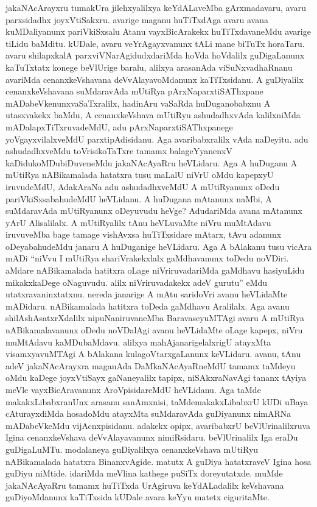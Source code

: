 \documentclass[11pt,a4size]{article}
\begin{document}
jakaNAcArayxru tumakUra jilehxyalilxya keYdALaveMba gArxmadavaru,
avaru parxsidadhx joyxVtiSakxru. avarige maganu huTiTxdAga avaru avana
kuMDaliyanunx pariVkiSxsalu Atanu vayxBicArakekx huTiTxdavaneMdu
avarige tiLidu baMditu. kUDale, avaru veYrAgayxvanunx tALi mane biTuTx
horaTaru. avaru shilapxkalA parxviVNarAgidudxdariMda hoVda hoVdalilx
guDigaLanunx kaTuTxtatx konege beVlUrige baralu, alilxya arasanAda
viSuNxvadhaRnanu avariMda cenanxkeVshavana deVvAlayavoMdanunx
kaTiTxsidanu. A guDiyalilx cenanxkeVshavana suMdaravAda mUtiRya
pArxNaparxtiSAThxpane mADabeVkenunxvaSaTxralilx, hadinAru vaSaRda
huDuganobabxnu A utasxvakekx baMdu, A cenanxkeVshava mUtiRyu
ashudadhxvAda kalilxniMda mADalapxTiTxruvadeMdU, adu
pArxNaparxtiSAThxpanege yoVgayxvilalxveMdU parxtipAdisidanu. Aga
avaribabxralilx vAda naDeyitu. adu ashudadhxveMdu toVrisikoTaTxre
tamamx balageYyanenxV kaDidukoMDubiDuveneMdu jakaNAcAyaRru
heVLidaru. Aga A huDuganu A mUtiRya nABikamalada hatatxra tusu maLalU
niVrU oMdu kapepxyU iruvudeMdU, AdakAraNa adu ashudadhxveMdU A
mUtiRyanunx oDedu pariVkiSxsabahudeMdU heVLidanu. A huDugana mAtanunx
naMbi, A suMdaravAda mUtiRyanunx oDeyuvudu heVge? AdudariMda avana
mAtanunx yArU Alisalilalx. A mUtiRyalilx tAnu heVLuvaMte niVru
muMtAdavu iruvuveMba bage tamage vishAvxsa huTiTxsidare mAtarx, tAvu
adanunx oDeyabahudeMdu janaru A huDuganige heVLidaru. Aga A bAlakanu
tusu vicAra mADi ``niVvu I mUtiRya shariVrakekxlalx gaMdhavanunx
toDedu noVDiri. aMdare nABikamalada hatitxra oLage niVriruvadariMda
gaMdhavu hasiyuLidu mikakxkaDege oNaguvudu. alilx niVriruvadakekx adeV
gurutu'' eMdu utatxravaninxtatxnu. nereda janarige A mAtu saridoVri
avanu heVLidaMte mADidaru. nABikamalada hatitxra toDeda gaMdhavu
Aralilalx. Aga avanu shilAshAsatxrXdalilx nipuNaniruvaneMba
BaravaseyuMTAgi avaru A mUtiRya nABikamalavanunx oDedu noVDalAgi avanu
heVLidaMte oLage kapepx, niVru muMtAdavu kaMDubaMdavu. alilxya
mahAjanarigelalxrigU atayxMta visamxyavuMTAgi A bAlakana
kulagoVtarxgaLanunx keVLidaru. avanu, tAnu adeV jakaNAcArayxra
maganAda DaMkaNAcAyaRneMdU tamamx taMdeyu oMdu kaDege joyxVtiSayx
gaNaneyalilx tapipx, niSAkxraNavAgi tananx tAyiya meVle
vayxBicAravanunx AroVpisidareMdU heVLidanu. Aga taMde
makakxLibabxranUnx arasanu sanAmxnisi, taMdemakakxLibabxrU kUDi uBaya
cAturayxdiMda hosadoMdu atayxMta suMdaravAda guDiyanunx nimARNa
mADabeVkeMdu vijAcnxpisidanu. adakekx opipx, avaribabxrU
beVlUrinalilxruva Igina cenanxkeVshava deVvAlayavanunx
nimiRsidaru. beVlUrinalilx Iga eraDu guDigaLuMTu. modalaneya
guDiyalilxya cenanxkeVshava mUtiRyu nABikamalada hatatxra
BinanxvAgide. matutx A guDiya hatatxraveV Igina hosa guDiyu
niMtide. idariMda meVlina kathege puSiTx doreyutatxde. muMde
jakaNAcAyaRru tamamx huTiTxda UrAgiruva keYdALadalilx keVshavana
guDiyoMdanunx kaTiTxsida kUDale avara keYyu matetx ciguritaMte.
\end{document}
